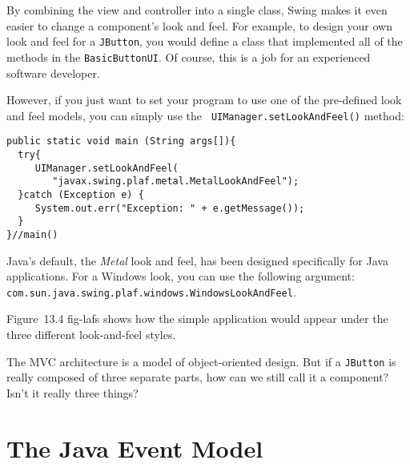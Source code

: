 By combining the view and controller into a single class, Swing makes
it even easier to change a component's look and feel.  For example, to
design your own look and feel for a {\tt JButton}, you would define a
class that implemented all of the methods in the
{\tt BasicButtonUI}. Of course, this is a job for an experienced software
developer.

However, if you just want to set your program to use one of the
pre-defined look and feel models, you can simply use the {\tt
UIManager.set\-LookAndFeel()} method:

\begin{jjjlisting}
\begin{lstlisting}
public static void main (String args[]){
  try{
     UIManager.setLookAndFeel(
        "javax.swing.plaf.metal.MetalLookAndFeel");
  }catch (Exception e) {
     System.out.err("Exception: " + e.getMessage());
  }
}//main()
\end{lstlisting}
\end{jjjlisting}

Java's default, the {\it Metal} look and feel, has been designed
specifically for Java applications.  For a Windows look, you can use
the following argument:
\verb|com.sun.java.swing.plaf.windows.WindowsLookAndFeel|.\break

\noindent Figure~13.4
 {fig-lafs}
shows how the simple application would appear under the
three different look-and-feel styles.



\begin{SSTUDY}

\item  The MVC architecture is a model of object-oriented design.  But if a
{\tt JButton} is really composed of three separate parts, how can we
still call it a component? Isn't it really three things?

\end{SSTUDY}

\section{The Java Event Model}
\label{the-java-event-model}

